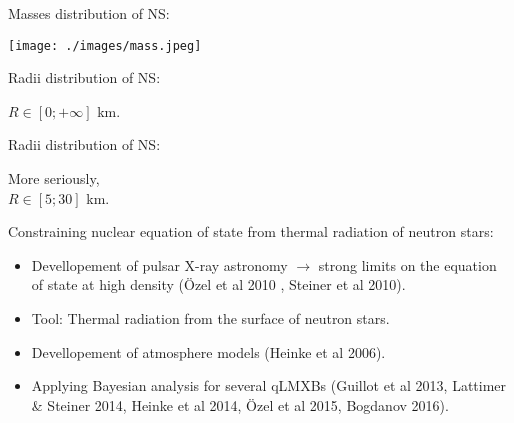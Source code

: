 \documentclass[francais]{beamer}
\begin{document}
\begin{frame}{Masses distribution of NS:}
\begin{center}
\texttt{[image: ./images/mass.jpeg]}
\end{center}
\end{frame}

\begin{frame}{Radii distribution of NS:}
\begin{center}
$R\in [0;+\infty]$ km.
\end{center}
\end{frame}

\begin{frame}{Radii distribution of NS:}
\begin{center}
More seriously,\\
$R\in [5;30]$ km.
\end{center}
\end{frame}


\begin{frame}{Constraining nuclear equation of state from thermal radiation of neutron stars: }
\begin{itemize}
\color{white}
	\item Devellopement of pulsar X-ray astronomy $\rightarrow$ strong limits on the equation of 				state at high density (\"Ozel et al 2010 , Steiner et al 2010).
	\vspace{+0.3cm}
	\item Tool: Thermal radiation from the surface of neutron stars.
	\vspace{+0.3cm}
	\item Devellopement of atmosphere models (Heinke et al 2006).
	\vspace{+0.3cm}
	\item Applying Bayesian analysis for several qLMXBs (Guillot et al 2013, Lattimer \& Steiner 2014, 				Heinke et al 2014, \"Ozel et al 2015, Bogdanov 2016).
\end{itemize}
\end{frame}
\end{document}
